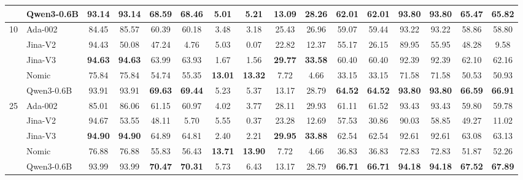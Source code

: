 \begin{sidewaystable}[htbp!]
\begin{tabular}{llcccccccccccccc}
& Qwen3-0.6B & 93.14 & 93.14 & \textbf{68.59} & \textbf{68.46} & 5.01 & 5.21 & 13.09 & 28.26 & \textbf{62.01} & \textbf{62.01} & \textbf{93.80} & \textbf{93.80} & \textbf{65.47} & \textbf{65.82} \\
\midrule
\multirow{5}{*}{10} & Ada-002 & 84.45 & 85.57 & 60.39 & 60.18 & 3.48 & 3.18 & 25.43 & 26.96 & 59.07 & 59.44 & 93.22 & 93.22 & 58.86 & 58.80 \\
& Jina-V2 & 94.43 & 50.08 & 47.24 & 4.76 & 5.03 & 0.07 & 22.82 & 12.37 & 55.17 & 26.15 & 89.95 & 55.95 & 48.28 & 9.58 \\
& Jina-V3 & \textbf{94.63} & \textbf{94.63} & 63.99 & 63.93 & 1.67 & 1.56 & \textbf{29.77} & \textbf{33.58} & 60.40 & 60.40 & 92.39 & 92.39 & 62.10 & 62.16 \\
& Nomic & 75.84 & 75.84 & 54.74 & 55.35 & \textbf{13.01} & \textbf{13.32} & 7.72 & 4.66 & 33.15 & 33.15 & 71.58 & 71.58 & 50.53 & 50.93 \\
& Qwen3-0.6B & 93.91 & 93.91 & \textbf{69.63} & \textbf{69.44} & 5.23 & 5.37 & 13.17 & 28.79 & \textbf{64.52} & \textbf{64.52} & \textbf{93.80} & \textbf{93.80} & \textbf{66.59} & \textbf{66.91} \\
\midrule
\multirow{5}{*}{25} & Ada-002 & 85.01 & 86.06 & 61.15 & 60.97 & 4.02 & 3.77 & 28.11 & 29.93 & 61.11 & 61.52 & 93.43 & 93.43 & 59.80 & 59.78 \\
& Jina-V2 & 94.67 & 53.55 & 48.11 & 5.70 & 5.55 & 0.37 & 23.28 & 12.69 & 57.53 & 30.86 & 90.03 & 58.85 & 49.27 & 11.02 \\
& Jina-V3 & \textbf{94.90} & \textbf{94.90} & 64.89 & 64.81 & 2.40 & 2.21 & \textbf{29.95} & \textbf{33.88} & 62.54 & 62.54 & 92.61 & 92.61 & 63.08 & 63.13 \\
& Nomic & 76.88 & 76.88 & 55.83 & 56.43 & \textbf{13.71} & \textbf{13.90} & 7.72 & 4.66 & 36.83 & 36.83 & 72.83 & 72.83 & 51.87 & 52.26 \\
& Qwen3-0.6B & 93.99 & 93.99 & \textbf{70.47} & \textbf{70.31} & 5.73 & 6.43 & 13.17 & 28.79 & \textbf{66.71} & \textbf{66.71} & \textbf{94.18} & \textbf{94.18} & \textbf{67.52} & \textbf{67.89} \\
\bottomrule
\end{tabular}
\end{sidewaystable}
\clearpage
